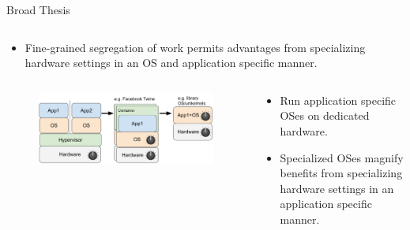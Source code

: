 \documentclass[notes=only,10pt,xcolor=table]{beamer}
\begin{document}
\begin{frame}{Broad Thesis}
{\begin{columns}
\begin{column}{.4\textwidth}
\begin{itemize}
            \item Fine-grained segregation of work permits advantages from specializing hardware settings in an OS and application specific manner.
        \end{itemize}
    \end{column}
\end{columns}
}
 {
\begin{columns}
    \begin{column}{.6\textwidth}
        \begin{figure}
            \includegraphics[width=1\textwidth]{img/Hypervisor_to_libos.pdf}
        \end{figure}
    \end{column}
    \begin{column}{.4\textwidth}
        \begin{itemize}
            \item Run application specific OSes on dedicated hardware.
            \item Specialized OSes magnify benefits from specializing hardware settings in an application specific manner.
        \end{itemize}
    \end{column}
\end{columns}
}
\end{frame}
\end{document}
